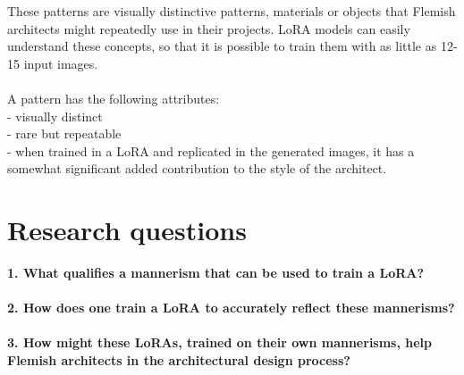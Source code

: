 These patterns are visually distinctive patterns, materials or objects that Flemish architects might repeatedly use in their projects. LoRA models can easily understand these concepts, so that it is possible to train them with as little as 12-15 input images.\\
\\
A pattern has the following attributes: \\
- visually distinct\\
- rare but repeatable \\
- when trained in a LoRA and replicated in the generated images, it has a somewhat significant added contribution to the style of the architect.


\section{Research questions}\label{sec:research questions}

\textbf{1. What qualifies a mannerism that can be used to train a LoRA?\\~\\2. How does one train a LoRA to accurately reflect these mannerisms?\\~\\3. How might these LoRAs, trained on their own mannerisms, help Flemish architects in the architectural design process?}